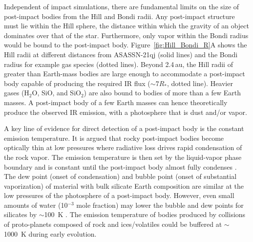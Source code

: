 \documentclass[sn-nature]{sn-jnl}%
\begin{document}
Independent of impact simulations, there are fundamental limits on the size of post-impact bodies from the Hill and Bondi radii.
%
Any post-impact structure must lie within the Hill sphere, the distance within which the gravity of an object dominates over that of the star.
%
Furthermore, only vapor within the Bondi radius would be bound to the post-impact body.
%
Figure~\ref{fig:Hill_Bondi_R}A shows the Hill radii at different distances from ASASSN-21qj (solid lines) and the Bondi radius for example gas species (dotted lines).
%
Beyond 2.4\,au, the Hill radii of greater than Earth-mass bodies are large enough to accommodate a post-impact body capable of producing the required IR flux ($\sim7R_*$, dotted line). 
%
Heavier gases (H$_2$O, SiO, and SiO$_2$) are also bound to bodies of more than a few Earth masses.
%
A post-impact body of a few Earth masses can hence theoretically produce the observed IR emission, with a photosphere that is dust and/or vapor.



A key line of evidence for direct detection of a post-impact body is the constant emission temperature.
%
It is argued \cite{Lock18} that rocky post-impact bodies become optically thin at low pressures where radiative loss drives rapid condensation of the rock vapor.
%
The emission temperature is then set by the liquid-vapor phase boundary and is constant until the post-impact body almost fully condenses \cite{Lock18,Caracas2023}.
%
The dew point (onset of condensation) and bubble point (onset of substantial vaporization) of material with bulk silicate Earth composition are similar \cite[$\sim2300$~K, within $\sim 100$~K;][]{Lock18,Fegley2023_BSE_cond} at the low pressures of the photosphere of a post-impact body.
%
However, even small amounts of water (10$^{-3}$ mole fraction) may lower the bubble and dew points for silicates by $\sim$100~K \cite[][]{Fegley2023_BSE_cond,Lock18}. 
%
The emission temperature of bodies produced by collisions of proto-planets composed of rock and ices/volatiles could be buffered at $\sim$1000~K during early evolution.


\end{document}
